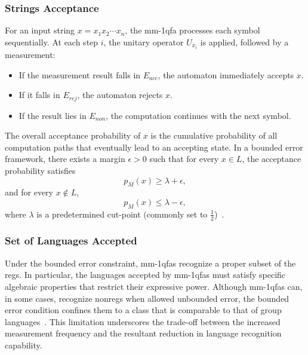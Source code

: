 \subsubsection{Strings Acceptance}
For an input string $x=x_1x_2\cdots x_n$, the \gls{mm-1qfa} processes each symbol sequentially. At each step $i$, the unitary operator $U_{x_i}$ is applied, followed by a measurement:
\begin{itemize}
    \item If the measurement result falls in $E_{acc}$, the automaton immediately accepts $x$.
    \item If it falls in $E_{rej}$, the automaton rejects $x$.
    \item If the result lies in $E_{non}$, the computation continues with the next symbol.
\end{itemize}
The overall acceptance probability of $x$ is the cumulative probability of all computation paths that eventually lead to an accepting state. In a bounded error framework, there exists a margin $\epsilon > 0$ such that for every $x\in L$, the acceptance probability satisfies
\[
p_M(x) \ge \lambda + \epsilon,
\]
and for every $x\notin L$, 
\[
p_M(x) \le \lambda - \epsilon,
\]
where $\lambda$ is a predetermined cut-point (commonly set to $\frac{1}{2}$)~\cite{kondacs1997power,brodsky2002characterizations}.

\subsubsection{Set of Languages Accepted}
Under the bounded error constraint, \glspl{mm-1qfa} recognize a proper subset of the \glspl{reg}. In particular, the languages accepted by \glspl{mm-1qfa} must satisfy specific algebraic properties that restrict their expressive power. Although \glspl{mm-1qfa} can, in some cases, recognize non\glspl{reg} when allowed unbounded error, the bounded error condition confines them to a class that is comparable to that of group languages~\cite{brodsky2002characterizations,kondacs1997power}. This limitation underscores the trade-off between the increased measurement frequency and the resultant reduction in language recognition capability.

